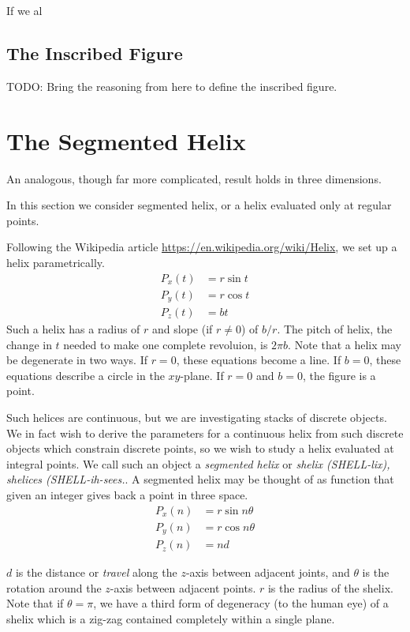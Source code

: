 \documentclass[11pt]{article}
\begin{document}
{If we al

\subsection{The Inscribed Figure}

TODO: Bring the reasoning from \cite{read2018transforming} here to define the inscribed figure.


\label{sec:2d}
\section{The Segmented Helix}

An analogous, though far more complicated, result holds in three dimensions.

In this section we consider segmented helix, or a helix evaluated only at regular points. 

Following the Wikipedia article \url{https://en.wikipedia.org/wiki/Helix}, we set up a helix parametrically.
\begin{align*}
    P_x(t) &= r \sin{t}  \\
    P_y(t) &= r \cos{t} \\
   P_z(t) &= b t
\end{align*}
Such a helix has a radius of $r$ and slope (if $r \neq 0$) of $b/r$.
The pitch of helix, the change in $t$ needed to make one complete revoluion, is $2\pi b$. Note that a helix may be degenerate in two ways.
If $r = 0$, these equations become a line. If $b = 0$, these equations describe a circle in the $xy$-plane.
If $r = 0$ and $b = 0$, the figure is a point.

Such helices are continuous, but we are investigating stacks of discrete objects. We in fact wish to derive
the parameters for a continuous helix from such discrete objects which constrain discrete points, so we wish
to study a helix evaluated at integral points. We call such an object a {\em segmented helix} or {\em shelix (SHELL-lix), shelices (SHELL-ih-sees.}.
A segmented helix may be thought of as function that given an integer gives back a point in three space.
\begin{align*}
    P_x(n) &= r \sin{n \theta}  \\
    P_y(n) &= r \cos{n \theta} \\
   P_z(n) &= n d
\end{align*}

$d$ is the distance or {\em travel} along the $z$-axis between adjacent joints, and $\theta$ is the rotation around the $z$-axis
between adjacent points. $r$ is the radius of the shelix.  Note that if $\theta = \pi$, we have a third form of degeneracy (to the human eye) of a shelix
which is a zig-zag contained completely within a single plane.

}
\end{document}

